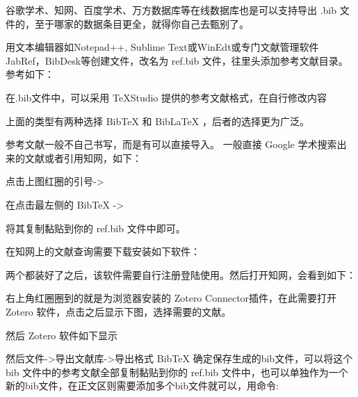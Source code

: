 谷歌学术、知网、百度学术、万方数据库等在线数据库也是可以支持导出 .bib
文件的，至于哪家的数据条目更全，就得你自己去甄别了。



用文本编辑器如Notepad++, Sublime
Text或WinEdt或专门文献管理软件JabRef，BibDesk等创建文件，改名为 ref.bib
文件，往里头添加参考文献目录。参考如下：

在.bib文件中，可以采用 TeXStudio 提供的参考文献格式，在自行修改内容

上面的类型有两种选择 BibTeX 和 BibLaTeX ，后者的选择更为广泛。

参考文献一般不自己书写，而是有可以直接导入。 一般直接 Google 学术搜索出来的文献或者引用知网，如下：

点击上图红圈的引号-\textgreater{}

在点击最左侧的 BibTeX -\textgreater{}

将其复制黏贴到你的 ref.bib 文件中即可。

在知网上的文献查询需要下载安装如下软件：

两个都装好了之后，该软件需要自行注册登陆使用。然后打开知网，会看到如下：

右上角红圈圈到的就是为浏览器安装的 Zotero Connector插件，在此需要打开 Zotero 软件，点击之后显示下图，选择需要的文献。

然后 Zotero 软件如下显示

然后文件-\textgreater{}导出文献库-\textgreater{}导出格式 BibTeX 确定保存生成的bib文件，可以将这个 bib 文件中的参考文献全部复制黏贴到你的 ref.bib 文件中，也可以单独作为一个新的bib文件，在正文区则需要添加多个bib文件就可以，用命令:

\begin{texlist}

\end{texlist}

